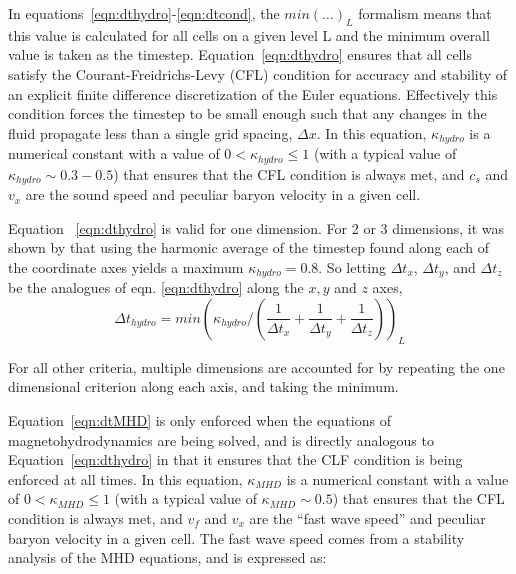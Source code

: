 

 In equations~\ref{eqn:dthydro}-\ref{eqn:dtcond}, the $min ( \ldots
)_L$ formalism means that this value is calculated for all cells on a
given level L and the minimum overall value is taken as the timestep.
Equation~\ref{eqn:dthydro} ensures that all cells satisfy the
Courant-Freidrichs-Levy (CFL) condition for accuracy and stability of
an explicit finite difference discretization of the Euler equations.
Effectively this condition forces the timestep to be small enough such
that any changes in the fluid propagate less than a single grid
spacing, $\Delta x$.  In this equation, $\kappa_{hydro}$ is a
numerical constant with a value of $0 < \kappa_{hydro} \leq 1$ (with a
typical value of $\kappa_{hydro} \sim 0.3-0.5$) that ensures that the
CFL condition is always met, and $c_s$ and $v_x$ are the sound speed
and peculiar baryon velocity in a given cell.

Equation ~\ref{eqn:dthydro} is valid for one dimension.  For 2 or 3
dimensions, it was shown by \cite{Godunov1959}  that using the
harmonic average of the timestep found along each of the coordinate
axes yields a maximum $\kappa_{hydro} = 0.8$.  So letting $\Delta
t_x$, $\Delta t_y$, and $\Delta t_z$ be the analogues of
eqn. \ref{eqn:dthydro} along the $x,y$ and $z$ axes, 
\begin{equation}
\Delta t_{hydro} = min ( \kappa_{hydro} /( \frac{1}{\Delta t_x}
+\frac{1}{\Delta t_y} + \frac{1}{\Delta t_z} ) )_L
\end{equation}

For all other criteria, multiple dimensions are accounted for by
repeating the one dimensional criterion along each axis, and taking
the minimum.

Equation~\ref{eqn:dtMHD} is only enforced when the equations of
magnetohydrodynamics are being solved, and is directly analogous to
Equation~\ref{eqn:dthydro} in that it ensures that the CLF condition
is being enforced at all times.  In this equation, $\kappa_{MHD}$ is a
numerical constant with a value of $0 < \kappa_{MHD} \leq 1$ (with a
typical value of $\kappa_{MHD} \sim 0.5$) that ensures that the CFL
condition is always met, and $v_f$ and $v_x$ are the ``fast wave
speed'' and peculiar baryon velocity in a given cell.  The fast wave
speed comes from a stability analysis of the MHD equations, and is
expressed as:

